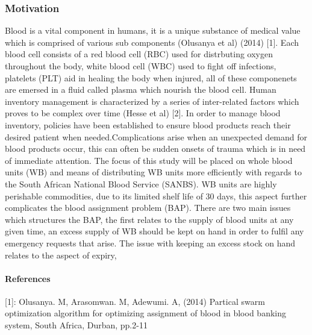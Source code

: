 \documentclass[12pt]{article}
\begin{document}
\subsubsection{Motivation}
Blood is a vital component in humans, it is a unique substance of medical value which is comprised of various sub components (Olusanya et al) (2014) [1]. Each blood cell consists of a red blood cell (RBC) used for distrbuting oxygen throughout the body, white blood cell (WBC) used to fight off infections, platelets (PLT) aid in healing the body when injured, all of these componenets are emersed in a fluid called plasma which nourish the blood cell. Human inventory management is characterized by a series of inter-related factors which proves to be complex over time (Hesse et al) [2]. In order to manage blood inventory, policies have been established to ensure blood products reach their desired patient when needed.Complications arise when an unexpected demand for blood products occur, this can often be sudden onsets of trauma which is in need of immediate attention. The focus of this study will be placed on whole blood units (WB) and means of distributing WB units more efficiently with regards to the South African National Blood Service (SANBS). WB units are highly perishable commodities, due to its limited shelf life of 30 days, this aspect further complicates the blood assignment problem (BAP). There are two main issues which structures the BAP, the first relates to the supply of blood units at any given time, an excess supply of WB should be kept on hand in order to fulfil any emergency requests that arise. The issue with keeping an excess stock on hand relates to the aspect of expiry, 

\paragraph{References}
[1]:  Olusanya. M, Arasomwan. M, Adewumi. A, (2014) Partical swarm optimization algorithm for optimizing assignment of blood in blood banking system, South Africa, Durban, pp.2-11\\
\end{document}
